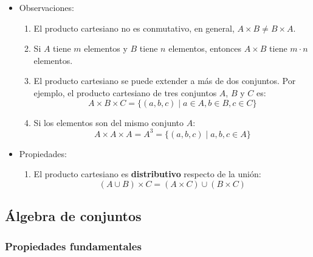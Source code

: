 \begin{itemize}
	\item Observaciones:
	
	\begin{enumerate}
		\item El producto cartesiano no es conmutativo, en general, \(A \times B \neq B \times A\).
		\item Si \(A\) tiene \(m\) elementos y \(B\) tiene \(n\) elementos, entonces \(A \times B\) tiene \(m \cdot n\) elementos.
		\item El producto cartesiano se puede extender a más de dos conjuntos. Por ejemplo, el producto cartesiano de tres conjuntos \(A\), \(B\) y \(C\) es:
		$$A \times B \times C = \{(a, b, c) \mid a \in A, b \in B, c \in C\}$$
		\item Si los elementos son del mismo conjunto $A$:
		\[ A \times A \times A = A^3 = \{(a, b, c) \mid a, b, c \in A\} \]
	\end{enumerate}
	
	\item Propiedades:
	\begin{enumerate}[label=\roman*)]
		\item El producto cartesiano es \textbf{distributivo} respecto de la unión:
		\[ \left( A \cup B \right) \times C = \left( A \times C \right) \cup \left( B \times C \right) \]
	\end{enumerate}
	
\end{itemize}


\subsection{Álgebra de conjuntos} \label{sec:algebra_conjuntos}
\subsubsection{Propiedades fundamentales}

